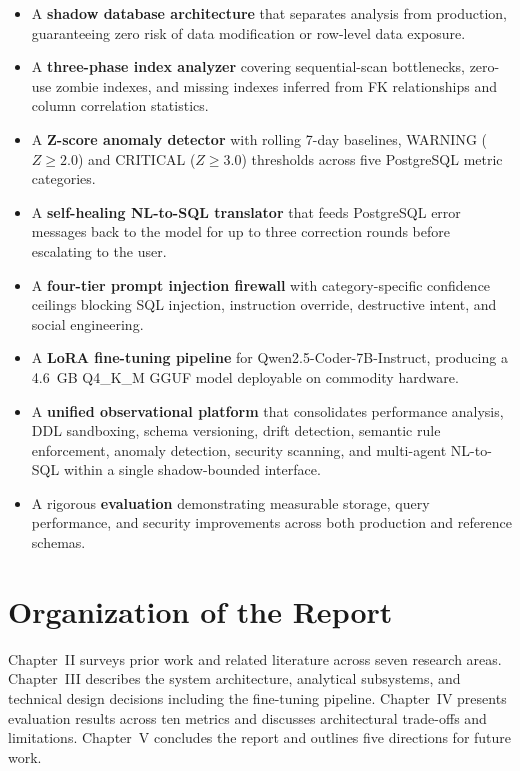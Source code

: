 \documentclass[12pt,a4paper]{report}
\begin{document}
\begin{itemize}
    \item A \textbf{shadow database architecture} that separates analysis from production, guaranteeing zero risk of data modification or row-level data exposure.
    \item A \textbf{three-phase index analyzer} covering sequential-scan bottlenecks, zero-use zombie indexes, and missing indexes inferred from FK relationships and column correlation statistics.
    \item A \textbf{Z-score anomaly detector} with rolling 7-day baselines, WARNING ($Z \geq 2.0$) and CRITICAL ($Z \geq 3.0$) thresholds across five PostgreSQL metric categories.
    \item A \textbf{self-healing NL-to-SQL translator} that feeds PostgreSQL error messages back to the model for up to three correction rounds before escalating to the user.
    \item A \textbf{four-tier prompt injection firewall} with category-specific confidence ceilings blocking SQL injection, instruction override, destructive intent, and social engineering.
    \item A \textbf{LoRA fine-tuning pipeline} for Qwen2.5-Coder-7B-Instruct, producing a 4.6~GB Q4\_K\_M GGUF model deployable on commodity hardware.
    \item A \textbf{unified observational platform} that consolidates performance analysis, DDL sandboxing, schema versioning, drift detection, semantic rule enforcement, anomaly detection, security scanning, and multi-agent NL-to-SQL within a single shadow-bounded interface.
    \item A rigorous \textbf{evaluation} demonstrating measurable storage, query performance, and security improvements across both production and reference schemas.
\end{itemize}

\section{Organization of the Report}

Chapter~II surveys prior work and related literature across seven research areas. Chapter~III describes the system architecture, analytical subsystems, and technical design decisions including the fine-tuning pipeline. Chapter~IV presents evaluation results across ten metrics and discusses architectural trade-offs and limitations. Chapter~V concludes the report and outlines five directions for future work.
\end{document}

